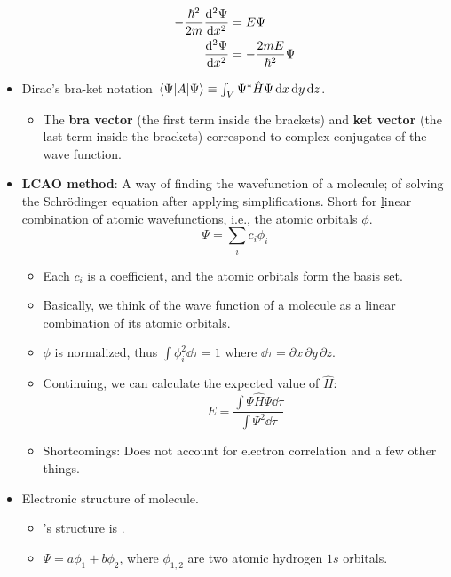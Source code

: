\documentclass[../notes.tex]{subfiles}
\begin{document}
\begin{itemize}
    \begin{align*}
        -\frac{\hbar^2}{2m}\dv[2]{\Psi}{x} &= E\Psi\\
        \dv[2]{\Psi}{x} &= -\frac{2mE}{\hbar^2}\Psi
    \end{align*}
    \item Dirac's bra-ket notation $\ev{A}{\Psi}\equiv\int_V\Psi^*\hat{H}\Psi\dd{x}\dd{y}\dd{z}$.
    \begin{itemize}
        \item The \textbf{bra vector} (the first term inside the brackets) and \textbf{ket vector} (the last term inside the brackets) correspond to complex conjugates of the wave function.
    \end{itemize}
    \item \textbf{LCAO method}: A way of finding the wavefunction of a molecule; of solving the Schr\"{o}dinger equation after applying simplifications. Short for \underline{l}inear \underline{c}ombination of atomic wavefunctions, i.e., the \underline{a}tomic \underline{o}rbitals $\phi$.
    \begin{equation*}
        \Psi = \sum_ic_i\phi_i
    \end{equation*}
    \begin{itemize}
        \item Each $c_i$ is a coefficient, and the atomic orbitals form the basis set.
        \item Basically, we think of the wave function of a molecule as a linear combination of its atomic orbitals.
        \item $\phi$ is normalized, thus $\int\phi_i^2\dd{\tau}=1$ where $\dd{\tau}=\partial x\, \partial y\, \partial z$.
        \item Continuing, we can calculate the expected value of $\hat{H}$:
        \begin{equation*}
            E = \frac{\int\Psi\hat{H}\Psi\dd{\tau}}{\int\Psi^2\dd{\tau}}
        \end{equation*}
        \item Shortcomings: Does not account for electron correlation and a few other things.
    \end{itemize}
    \item Electronic structure of  molecule.
    \begin{itemize}
        \item {}'s structure is .
        \item $\Psi=a\phi_1+b\phi_2$, where $\phi_{1,2}$ are two atomic hydrogen $1s$ orbitals.

\end{itemize}
\end{itemize}
\end{document}
